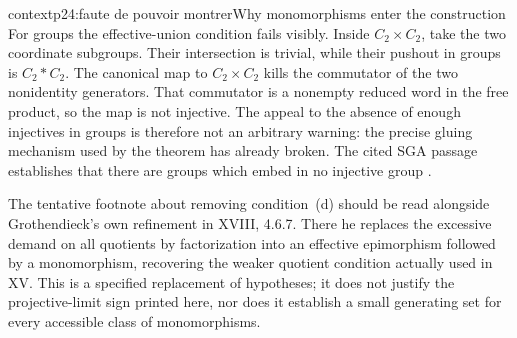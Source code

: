 \begin{dcomment}{context}{p24:faute de pouvoir montrer}{Why monomorphisms enter the construction}
For groups the effective-union condition fails visibly. Inside $C_2\times C_2$, take the two coordinate subgroups. Their intersection is trivial, while their pushout in groups is $C_2*C_2$. The canonical map to $C_2\times C_2$ kills the commutator of the two nonidentity generators. That commutator is a nonempty reduced word in the free product, so the map is not injective. The appeal to the absence of enough injectives in groups is therefore not an arbitrary warning: the precise gluing mechanism used by the theorem has already broken. The cited SGA passage establishes that there are groups which embed in no injective group \citep[Exposé~I, Example~8.12.9]{SGA4I1972}.

The tentative footnote about removing condition~(d) should be read alongside Grothendieck's own refinement in XVIII, 4.6.7. There he replaces the excessive demand on all quotients by factorization into an effective epimorphism followed by a monomorphism, recovering the weaker quotient condition actually used in XV. This is a specified replacement of hypotheses; it does not justify the projective-limit sign printed here, nor does it establish a small generating set for every accessible class of monomorphisms.
\end{dcomment}


